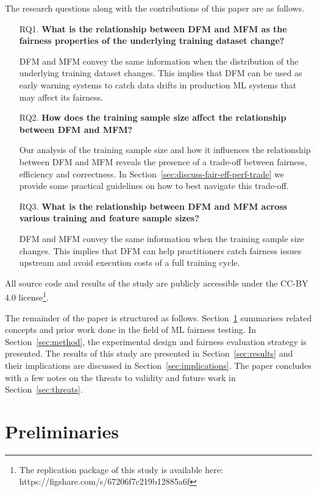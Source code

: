 \documentclass[conference]{IEEEtran}
\begin{document}
The research questions along with the contributions of this paper are
as follows.
\begin{enumerate}
  \item[RQ1.] \textbf{What is the relationship between DFM and MFM as the
    fairness properties of the underlying training dataset change?}

    DFM and MFM convey the same information when the distribution of
    the underlying training dataset changes. This implies that DFM can
    be used as early warning systems to catch data drifts in
    production ML systems that may affect its fairness.

  \item[RQ2.] \textbf{How does the training sample size affect the
    relationship between DFM and MFM?}

    Our analysis of the training sample size and how it influences the
    relationship between DFM and MFM reveals the presence of a
    trade-off between fairness, efficiency and correctness. In
    Section \ref{sec:discuss-fair-eff-perf-trade} we provide some
    practical guidelines on how to best navigate this trade-off.

  \item[RQ3.] \textbf{What is the relationship between DFM and MFM across
    various training and feature sample sizes?}

    DFM and MFM convey the same information when the training sample
    size changes. This implies that DFM can help practitioners catch
    fairness issues upstream and avoid execution costs of a full
    training cycle.
\end{enumerate}

All source code and results of the study are publicly accessible under the CC-BY 4.0 license\footnote{The replication package of this study is available here: https://figshare.com/s/67206f7c219b12885a6f}.

The remainder of the paper is structured as follows.
Section \ref{sec:related} summarises related concepts and prior work
done in the field of ML fairness testing. In Section \ref{sec:method},
the experimental design and fairness evaluation strategy is presented.
The results of this study are presented in Section \ref{sec:results}
and their implications are discussed in
Section \ref{sec:implications}. The paper concludes with a few notes
on the threats to validity and future work in
Section \ref{sec:threats}.

\section{Preliminaries}\label{sec:related}
\end{document}
